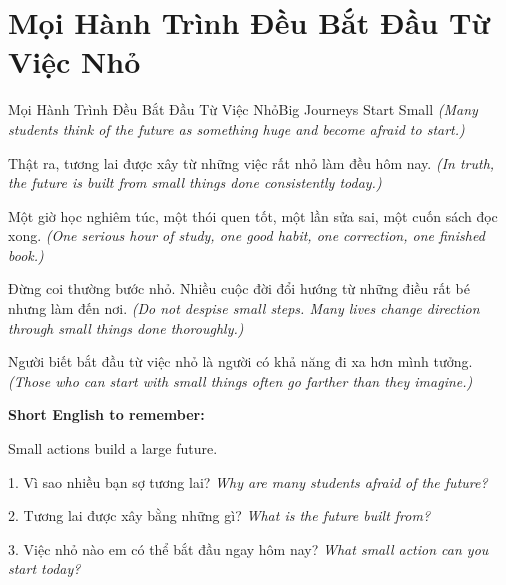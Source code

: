 \section{Mọi Hành Trình Đều Bắt Đầu Từ Việc Nhỏ}
\begin{truyen}{Mọi Hành Trình Đều Bắt Đầu Từ Việc Nhỏ}{Big Journeys Start Small}
\textit{(Many students think of the future as something huge and become afraid to start.)}

Thật ra, tương lai được xây từ những việc rất nhỏ làm đều hôm nay.
\textit{(In truth, the future is built from small things done consistently today.)}

Một giờ học nghiêm túc, một thói quen tốt, một lần sửa sai, một cuốn sách đọc xong.
\textit{(One serious hour of study, one good habit, one correction, one finished book.)}

Đừng coi thường bước nhỏ. Nhiều cuộc đời đổi hướng từ những điều rất bé nhưng làm đến nơi.
\textit{(Do not despise small steps. Many lives change direction through small things done thoroughly.)}
\end{truyen}

\begin{baihoc}
Người biết bắt đầu từ việc nhỏ là người có khả năng đi xa hơn mình tưởng.
\textit{(Those who can start with small things often go farther than they imagine.)}
\end{baihoc}

\begin{ghinhoanh}
\textbf{Short English to remember:}

Small actions build a large future.

\end{ghinhoanh}

\begin{tuhocnhanh}
1. Vì sao nhiều bạn sợ tương lai? \textit{Why are many students afraid of the future?}

2. Tương lai được xây bằng những gì? \textit{What is the future built from?}

3. Việc nhỏ nào em có thể bắt đầu ngay hôm nay? \textit{What small action can you start today?}
\end{tuhocnhanh}
\ngancach

